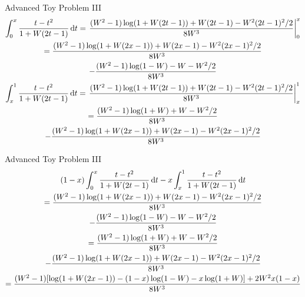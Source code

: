 \documentclass[11pt,compress,xcolor={usenames,dvipsnames},aspectratio=169]{beamer}
\begin{document}
\begin{frame}{Advanced Toy Problem III}
\vspace{-3ex}
\begin{gather*}
    \int_0^x \frac{t - t^2}{1 +  W (2t-1)} \, {\rm d} t = \left . \frac{(W^2 -1) \log(1+W(2t-1)) + W(2t-1)- W^2(2t-1)^2/2}{8W^3} \right \rvert_0^x \\
    = \frac{(W^2 -1) \log(1+W(2x-1)) + W(2x-1)- W^2(2x-1)^2/2}{8W^3} \\ 
    -  \frac{(W^2 -1) \log(1-W) - W- W^2/2}{8W^3} \\
    \int_x^1 \frac{t - t^2}{1 +  W (2t-1)} \, {\rm d} t = 
    \left . \frac{(W^2 -1) \log(1+W(2t-1)) + W(2t-1)- W^2(2t-1)^2/2}{8W^3} \right \rvert_x^1 \\
    = \frac{(W^2 -1) \log(1+W) + W- W^2/2}{8W^3}\\ 
    -\frac{(W^2 -1) \log(1+W(2x-1)) + W(2x-1)- W^2(2x-1)^2/2}{8W^3} \\ 
\end{gather*}


\end{frame}

\begin{frame}{Advanced Toy Problem III}
\vspace{-5ex}
{\small
\begin{gather*}
    (1-x)\int_0^x \frac{t - t^2}{1 +  W (2t-1)} \, {\rm d} t - x \int_x^1 \frac{t - t^2}{1 +  W (2t-1)} \, {\rm d} t \\
    = \frac{(W^2 -1) \log(1+W(2x-1)) + W(2x-1)- W^2(2x-1)^2/2}{8W^3} \\ 
    -  \frac{(W^2 -1) \log(1-W) - W- W^2/2}{8W^3} \\
    = \frac{(W^2 -1) \log(1+W) + W- W^2/2}{8W^3}\\ 
    -\frac{(W^2 -1) \log(1+W(2x-1)) + W(2x-1)- W^2(2x-1)^2/2}{8W^3} \\ 
    = \frac{(W^2 -1) [\log(1+W(2x-1)) - (1-x) \log(1-W) -x \log(1+W)] + 2W^2x(1-x)}{8W^3}
\end{gather*}
}


\end{frame}
\end{document}
